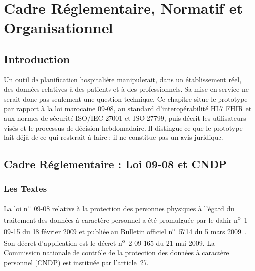 \chapter{Cadre Réglementaire, Normatif et Organisationnel}
\label{ch:cadre_reglementaire}

\section*{Introduction}
Un outil de planification hospitalière manipulerait, dans un établissement réel, des données relatives à des patients et à des professionnels. Sa mise en service ne serait donc pas seulement une question technique. Ce chapitre situe le prototype par rapport à la loi marocaine 09-08, au standard d'interopérabilité HL7 FHIR et aux normes de sécurité ISO/IEC 27001 et ISO 27799, puis décrit les utilisateurs visés et le processus de décision hebdomadaire. Il distingue ce que le prototype fait déjà de ce qui resterait à faire ; il ne constitue pas un avis juridique.

\section{Cadre Réglementaire : Loi 09-08 et CNDP}

\subsection{Les Textes}
La loi n\textsuperscript{o}~09-08 relative à la protection des personnes physiques à l'égard du traitement des données à caractère personnel a été promulguée par le dahir n\textsuperscript{o}~1-09-15 du 18 février 2009 et publiée au Bulletin officiel n\textsuperscript{o}~5714 du 5 mars 2009~\cite{loi0908}. Son décret d'application est le décret n\textsuperscript{o}~2-09-165 du 21 mai 2009. La Commission nationale de contrôle de la protection des données à caractère personnel (CNDP) est instituée par l'article~27.

